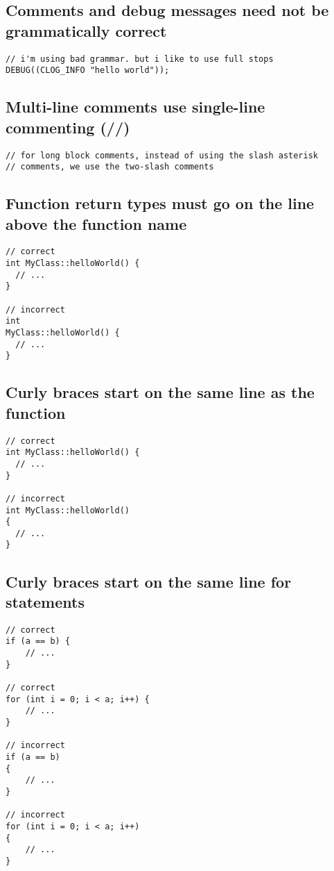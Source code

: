 \documentclass{article}
\begin{document}
\subsection{Comments and debug messages need not be grammatically correct}

\begin{verbatim}
// i'm using bad grammar. but i like to use full stops
DEBUG((CLOG_INFO "hello world"));
\end{verbatim}

\subsection{Multi-line comments use single-line commenting (//)}

\begin{verbatim}
// for long block comments, instead of using the slash asterisk
// comments, we use the two-slash comments
\end{verbatim}

\subsection{Function return types must go on the line above the function name}

\begin{verbatim}
// correct
int MyClass::helloWorld() {
  // ...
}

// incorrect
int
MyClass::helloWorld() {
  // ...
}
\end{verbatim}

\subsection{Curly braces start on the same line as the function}

\begin{verbatim}
// correct
int MyClass::helloWorld() {
  // ...
}

// incorrect
int MyClass::helloWorld()
{
  // ...
}
\end{verbatim}

\subsection{Curly braces start on the same line for statements}

\begin{verbatim}
// correct
if (a == b) {
    // ...
}

// correct
for (int i = 0; i < a; i++) {
    // ...
}

// incorrect
if (a == b)
{
    // ...
}

// incorrect
for (int i = 0; i < a; i++)
{
    // ...
}
\end{verbatim}
\end{document}
